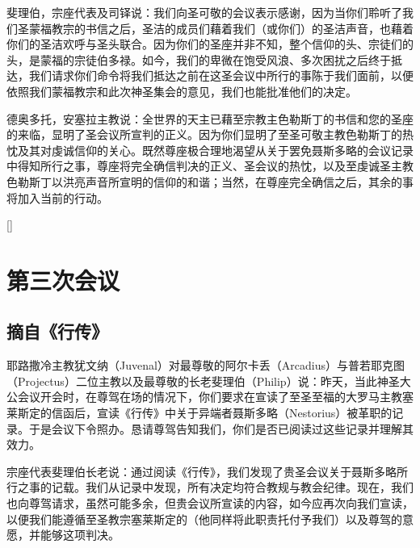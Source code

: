 斐理伯，宗座代表及司铎说：我们向圣可敬的会议表示感谢，因为当你们聆听了我们圣蒙福教宗的书信之后，圣洁的成员们藉着我们（或你们）的圣洁声音，也藉着你们的圣洁欢呼与圣头联合。因为你们的圣座并非不知，整个信仰的头、宗徒们的头，是蒙福的宗徒伯多禄。如今，我们的卑微在饱受风浪、多次困扰之后终于抵达，我们请求你们命令将我们抵达之前在这圣会议中所行的事陈于我们面前，以便依照我们蒙福教宗和此次神圣集会的意见，我们也能批准他们的决定。\par

德奥多托，安塞拉主教说：全世界的天主已藉至宗教主色勒斯丁的书信和您的圣座的来临，显明了圣会议所宣判的正义。因为你们显明了至圣可敬主教色勒斯丁的热忱及其对虔诚信仰的关心。既然尊座极合理地渴望从关于罢免聂斯多略的会议记录中得知所行之事，尊座将完全确信判决的正义、圣会议的热忱，以及至虔诚圣主教色勒斯丁以洪亮声音所宣明的信仰的和谐；当然，在尊座完全确信之后，其余的事将加入当前的行动。\par

[]\par


\section{第三次会议}


\subsection{摘自《行传》}

耶路撒冷主教犹文纳（Juvenal）对最尊敬的阿尔卡丢（Arcadius）与普若耶克图（Projectus）二位主教以及最尊敬的长老斐理伯（Philip）说：昨天，当此神圣大公会议开会时，在尊驾在场的情况下，你们要求在宣读了至圣至福的大罗马主教塞莱斯定的信函后，宣读《行传》中关于异端者聂斯多略（Nestorius）被革职的记录。于是会议下令照办。恳请尊驾告知我们，你们是否已阅读过这些记录并理解其效力。\par

宗座代表斐理伯长老说：通过阅读《行传》，我们发现了贵圣会议关于聂斯多略所行之事的记载。我们从记录中发现，所有决定均符合教规与教会纪律。现在，我们也向尊驾请求，虽然可能多余，但贵会议所宣读的内容，如今应再次向我们宣读，以便我们能遵循至圣教宗塞莱斯定的（他同样将此职责托付予我们）以及尊驾的意愿，并能够这项判决。\par

